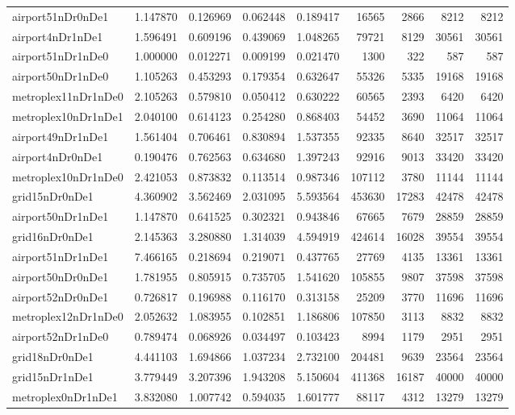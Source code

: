 \begin{longtable}{|l|r|r|r|r|r|r|r|r|}
airport51nDr0nDe1 & 1.147870 & 0.126969 & 0.062448 & 0.189417 & 16565 & 2866 & 8212 & 8212 \\
airport4nDr1nDe1 & 1.596491 & 0.609196 & 0.439069 & 1.048265 & 79721 & 8129 & 30561 & 30561 \\
airport51nDr1nDe0 & 1.000000 & 0.012271 & 0.009199 & 0.021470 & 1300 & 322 & 587 & 587 \\
airport50nDr1nDe0 & 1.105263 & 0.453293 & 0.179354 & 0.632647 & 55326 & 5335 & 19168 & 19168 \\
metroplex11nDr1nDe0 & 2.105263 & 0.579810 & 0.050412 & 0.630222 & 60565 & 2393 & 6420 & 6420 \\
metroplex10nDr1nDe1 & 2.040100 & 0.614123 & 0.254280 & 0.868403 & 54452 & 3690 & 11064 & 11064 \\
airport49nDr1nDe1 & 1.561404 & 0.706461 & 0.830894 & 1.537355 & 92335 & 8640 & 32517 & 32517 \\
airport4nDr0nDe1 & 0.190476 & 0.762563 & 0.634680 & 1.397243 & 92916 & 9013 & 33420 & 33420 \\
metroplex10nDr1nDe0 & 2.421053 & 0.873832 & 0.113514 & 0.987346 & 107112 & 3780 & 11144 & 11144 \\
grid15nDr0nDe1 & 4.360902 & 3.562469 & 2.031095 & 5.593564 & 453630 & 17283 & 42478 & 42478 \\
airport50nDr1nDe1 & 1.147870 & 0.641525 & 0.302321 & 0.943846 & 67665 & 7679 & 28859 & 28859 \\
grid16nDr0nDe1 & 2.145363 & 3.280880 & 1.314039 & 4.594919 & 424614 & 16028 & 39554 & 39554 \\
airport51nDr1nDe1 & 7.466165 & 0.218694 & 0.219071 & 0.437765 & 27769 & 4135 & 13361 & 13361 \\
airport50nDr0nDe1 & 1.781955 & 0.805915 & 0.735705 & 1.541620 & 105855 & 9807 & 37598 & 37598 \\
airport52nDr0nDe1 & 0.726817 & 0.196988 & 0.116170 & 0.313158 & 25209 & 3770 & 11696 & 11696 \\
metroplex12nDr1nDe0 & 2.052632 & 1.083955 & 0.102851 & 1.186806 & 107850 & 3113 & 8832 & 8832 \\
airport52nDr1nDe0 & 0.789474 & 0.068926 & 0.034497 & 0.103423 & 8994 & 1179 & 2951 & 2951 \\
grid18nDr0nDe1 & 4.441103 & 1.694866 & 1.037234 & 2.732100 & 204481 & 9639 & 23564 & 23564 \\
grid15nDr1nDe1 & 3.779449 & 3.207396 & 1.943208 & 5.150604 & 411368 & 16187 & 40000 & 40000 \\
metroplex0nDr1nDe1 & 3.832080 & 1.007742 & 0.594035 & 1.601777 & 88117 & 4312 & 13279 & 13279 \\

\end{longtable}
